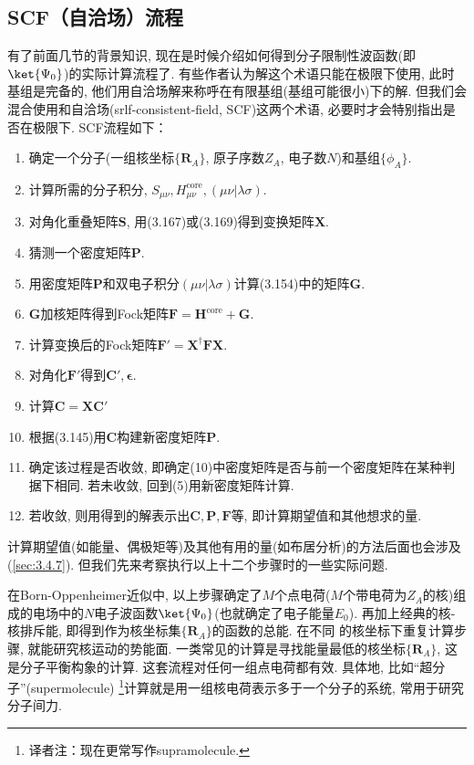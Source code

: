 \subsection{SCF（自洽场）流程}
\label{sec:3.4.6}
有了前面几节的背景知识, 
现在是时候介绍如何得到分子限制性波函数(即$\ket{\Psi_0}$)的实际计算流程了. 
有些作者认为\hft 解这个术语只能在\hft 极限下使用, 
此时基组是完备的, 
他们用自洽场解来称呼在有限基组(基组可能很小)下的解. 
但我们会混合使用\hft 和自洽场(srlf-consistent-field, SCF)这两个术语, 
必要时才会特别指出是否在\hft 极限下. 
SCF流程如下：
\begin{enumerate}[1.]
	\item 确定一个分子(一组核坐标$\{\mathbf{R}_A\}$, 原子序数$Z_A$, 电子数$N$)和基组$\{\phi_A\}$.
	\item 计算所需的分子积分, $S_{\mu\nu},H_{\mu\nu}^\mathrm{core}, (\mu\nu|\lambda\sigma)$.
	\item 对角化重叠矩阵$\mathbf{S}$, 用(3.167)或(3.169)得到变换矩阵$\mathbf{X}$.
	\item 猜测一个密度矩阵$\mathbf{P}$.
	\item 用密度矩阵$\mathbf{P}$和双电子积分$(\mu\nu|\lambda\sigma)$计算(3.154)中的矩阵$\mathbf{G}$.
	\item $\mathbf{G}$加核\ha 矩阵得到Fock矩阵$\mathbf{F=H}^\mathrm{core}+\mathbf{G}$.
	\item 计算变换后的Fock矩阵$\mathbf{F'=X^\dagger FX}$.
	\item 对角化$\mathbf{F'}$得到$\mathbf{C'},\bm{\epsilon}$.
	\item 计算$\mathbf{C}=\mathbf{XC'}$
	\item 根据(3.145)用$\mathbf{C}$构建新密度矩阵$\mathbf{P}$.
	\item 确定该过程是否收敛, 即确定(10)中密度矩阵是否与前一个密度矩阵在某种判据下相同. 若未收敛, 回到(5)用新密度矩阵计算.
	\item 若收敛, 则用得到的解表示出$\mathbf{C,P,F}$等, 即计算期望值和其他想求的量.
\end{enumerate}
计算期望值(如能量、偶极矩等)及其他有用的量(如布居分析)的方法后面也会涉及(\autoref{sec:3.4.7}). 
但我们先来考察执行以上十二个步骤时的一些实际问题.


在Born-Oppenheimer近似中, 
以上步骤确定了$M$个点电荷($M$个带电荷为$Z_A$的核)组成的电场中的$N$电子波函数$\ket{\Psi_0}$(也就确定了电子能量$E_0$). 
再加上经典的核-核排斥能, 即得到作为核坐标集$\{\mathbf{R}_A\}$的函数的总能. 
在不同 的核坐标下重复计算步骤, 
就能研究核运动的势能面. 
一类常见的计算是寻找能量最低的核坐标$\{\mathbf{R}_A\}$, 
这是分子平衡构象的计算. 
这套流程对任何一组点电荷都有效. 
具体地, 
比如``超分子''(supermolecule)
\footnote{译者注：现在更常写作supramolecule.}计算就是用一组核电荷表示多于一个分子的系统, 
常用于研究分子间力.


